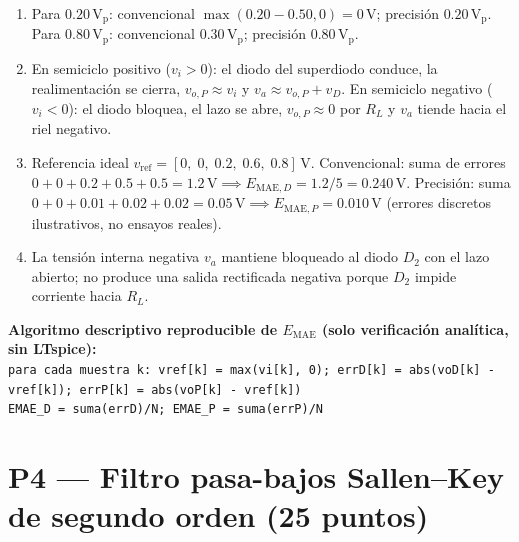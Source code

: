 \documentclass[10pt, a4paper]{article}
\begin{document}
\begin{enumerate}
    \setlength{\itemsep}{2pt}
    \item Para $0.20\,\mathrm{V_p}$: convencional $\max(0.20 - 0.50, 0) = 0\,\mathrm{V}$; precisión $0.20\,\mathrm{V_p}$. Para $0.80\,\mathrm{V_p}$: convencional $0.30\,\mathrm{V_p}$; precisión $0.80\,\mathrm{V_p}$.
    \item En semiciclo positivo ($v_i > 0$): el diodo del superdiodo conduce, la realimentación se cierra, $v_{o,P} \approx v_i$ y $v_a \approx v_{o,P} + v_D$. En semiciclo negativo ($v_i < 0$): el diodo bloquea, el lazo se abre, $v_{o,P} \approx 0$ por $R_L$ y $v_a$ tiende hacia el riel negativo.
    \item Referencia ideal $v_{\mathrm{ref}} = [0,\; 0,\; 0.2,\; 0.6,\; 0.8]\,\mathrm{V}$. Convencional: suma de errores $0 + 0 + 0.2 + 0.5 + 0.5 = 1.2\,\mathrm{V} \implies E_{\mathrm{MAE},D} = 1.2/5 = 0.240\,\mathrm{V}$. Precisión: suma $0 + 0 + 0.01 + 0.02 + 0.02 = 0.05\,\mathrm{V} \implies E_{\mathrm{MAE},P} = 0.010\,\mathrm{V}$ (errores discretos ilustrativos, no ensayos reales).
    \item La tensión interna negativa $v_a$ mantiene bloqueado al diodo $D_2$ con el lazo abierto; no produce una salida rectificada negativa porque $D_2$ impide corriente hacia $R_L$.
\end{enumerate}

\begin{tcolorbox}[colback=neutralbg, colframe=ucbblue!60, boxrule=0.5pt, arc=1mm, left=6pt, right=6pt, top=3pt, bottom=3pt]
    \scriptsize\textbf{Algoritmo descriptivo reproducible de $E_{\mathrm{MAE}}$ (solo verificación analítica, sin LTspice):}\\
    \texttt{para cada muestra k: vref[k] = max(vi[k], 0); errD[k] = abs(voD[k] - vref[k]); errP[k] = abs(voP[k] - vref[k])}\\
    \texttt{EMAE\_D = suma(errD)/N; \quad EMAE\_P = suma(errP)/N}
\end{tcolorbox}

\newpage
\section*{P4 --- Filtro pasa-bajos Sallen--Key de segundo orden (25 puntos)}
\end{document}
